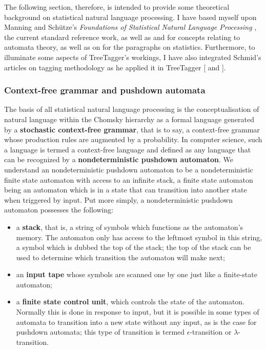 The following section, therefore, is intended to provide some theoretical
background on statistical natural language processing. I have based myself upon
Manning and Schütze's \textit{Foundations of Statistical Natural Language
Processing} \citep{manning1999}, the current standard reference work, as well
as \citet{koshy2004} and \citet{hopcroft2001} for concepts relating to automata
theory, as well as on \citet{bod2004} for the paragraphs on statistics.
Furthermore, to illuminate some aspects of TreeTagger's workings, I have also
integrated Schmid's articles on tagging methodology as he applied it in
TreeTagger [\citeyear{schmid1994} and \citeyear{schmid1995}]. 

\subsubsection{Context-free grammar and pushdown automata} %
\label{sub:formallang}

The basis of all statistical natural language processing is the
conceptualisation of natural language within the Chomsky hierarchy as a formal
language generated by a \textbf{stochastic context-free grammar}, that is to say, a
context-free grammar whose production rules are augmented by a probability. In
computer science, such a language is termed a context-free language and defined
as any language that can be recognized by a \textbf{nondeterministic pushdown
automaton}. We understand an nondeterministic pushdown automaton to be a
nondeterministic finite state automaton with access to an infinite stack, a
finite state automaton being an automaton which is in a state that can
transition into another state when triggered by input. Put more simply, a
nondeterministic pushdown automaton possesses the following:

\begin{itemize} 
  
  \item a \textbf{stack}, that is, a string of symbols which functions as the
    automaton's memory. The automaton only has access to the leftmost symbol in
    this string, a symbol which is dubbed the top of the stack; the top of the
    stack can be used to determine which transition the automaton will make
    next;
    
  \item an \textbf{input tape} whose symbols are scanned one by one just like a
    finite-state automaton; 
    
    \item a \textbf{finite state control unit}, which controls the state of the
      automaton. Normally this is done in response to input, but it is possible
      in some types of automata to transition into a new state without any
      input, as is the case for pushdown automata; this type of transition is
      termed $\epsilon$-transition or $\lambda$-transition.
    
\end{itemize}


